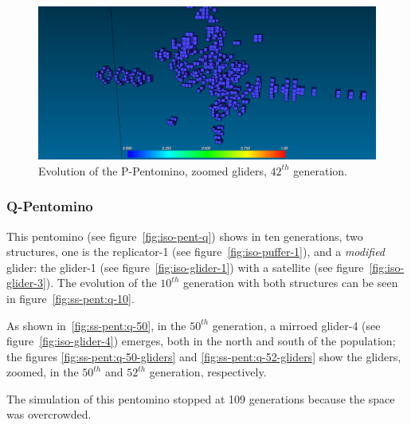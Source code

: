 \begin{figure}
	\centering
	\includegraphics[scale=0.3]{pentominoes_ss/p_42_gliders.png}
	\caption{Evolution of the P-Pentomino, zoomed gliders, $42^{th}$ generation.}
  \label{fig:ss-pent:p-42-glider}
\end{figure}


\subsubsection{Q-Pentomino}
\label{sec:q-pentomino}
This pentomino (see figure~\ref{fig:iso-pent-q}) shows in ten generations, two
structures, one is the replicator-1 (see figure~\ref{fig:iso-puffer-1}), and a
\textit{modified} glider: the glider-1 (see figure~\ref{fig:iso-glider-1}) with
a satellite (see figure~\ref{fig:iso-glider-3}). The evolution of the $10^{th}$
generation with both structures can be seen in figure~\ref{fig:ss-pent:q-10}.

As shown in~\ref{fig:ss-pent:q-50}, in the $50^{th}$ generation, a mirroed
glider-4 (see figure~\ref{fig:iso-glider-4}) emerges, both in the north and
south of the population; the figures \ref{fig:ss-pent:q-50-gliders} and
\ref{fig:ss-pent:q-52-gliders} show the gliders, zoomed, in the $50^{th}$ and
$52^{th}$ generation, respectively.

The simulation of this pentomino stopped at 109 generations because the space
was overcrowded.

